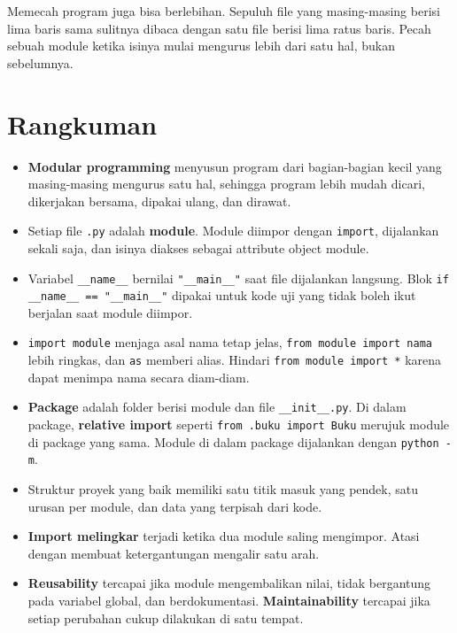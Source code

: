 \begin{tips}
Memecah program juga bisa berlebihan. Sepuluh file yang masing-masing berisi lima baris sama sulitnya dibaca dengan satu file berisi lima ratus baris. Pecah sebuah module ketika isinya mulai mengurus lebih dari satu hal, bukan sebelumnya.
\end{tips}

\section{Rangkuman}

\begin{itemize}
  \item \textbf{Modular programming} menyusun program dari bagian-bagian kecil yang masing-masing mengurus satu hal, sehingga program lebih mudah dicari, dikerjakan bersama, dipakai ulang, dan dirawat.
  \item Setiap file \texttt{.py} adalah \textbf{module}. Module diimpor dengan \texttt{import}, dijalankan sekali saja, dan isinya diakses sebagai attribute object module.
  \item Variabel \texttt{\_\_name\_\_} bernilai \texttt{"\_\_main\_\_"} saat file dijalankan langsung. Blok \texttt{if \_\_name\_\_ == "\_\_main\_\_"} dipakai untuk kode uji yang tidak boleh ikut berjalan saat module diimpor.
  \item \texttt{import module} menjaga asal nama tetap jelas, \texttt{from module import nama} lebih ringkas, dan \texttt{as} memberi alias. Hindari \texttt{from module import *} karena dapat menimpa nama secara diam-diam.
  \item \textbf{Package} adalah folder berisi module dan file \texttt{\_\_init\_\_.py}. Di dalam package, \textbf{relative import} seperti \texttt{from .buku import Buku} merujuk module di package yang sama. Module di dalam package dijalankan dengan \texttt{python -m}.
  \item Struktur proyek yang baik memiliki satu titik masuk yang pendek, satu urusan per module, dan data yang terpisah dari kode.
  \item \textbf{Import melingkar} terjadi ketika dua module saling mengimpor. Atasi dengan membuat ketergantungan mengalir satu arah.
  \item \textbf{Reusability} tercapai jika module mengembalikan nilai, tidak bergantung pada variabel global, dan berdokumentasi. \textbf{Maintainability} tercapai jika setiap perubahan cukup dilakukan di satu tempat.
\end{itemize}

